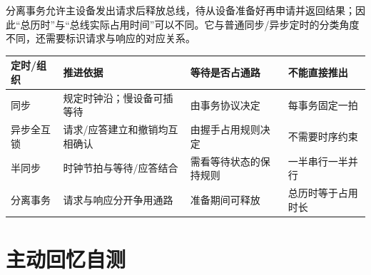 分离事务允许主设备发出请求后释放总线，待从设备准备好再申请并返回结果；因此``总历时''与``总线实际占用时间''可以不同。它与普通同步/异步定时的分类角度不同，还需要标识请求与响应的对应关系。

\begin{wideblock}

\par\medskip\noindent\begin{minipage}{\linewidth}\fontsize{9.3}{12}\selectfont\begin{tabularx}{\linewidth}{@{}YYYY@{}}
\toprule\noalign{}
\begin{minipage}[b]{\linewidth}\raggedright
定时/组织
\end{minipage} & \begin{minipage}[b]{\linewidth}\raggedright
推进依据
\end{minipage} & \begin{minipage}[b]{\linewidth}\raggedright
等待是否占通路
\end{minipage} & \begin{minipage}[b]{\linewidth}\raggedright
不能直接推出
\end{minipage} \\
\midrule\noalign{}


同步 & 规定时钟沿；慢设备可插等待 & 由事务协议决定 & 每事务固定一拍 \\
异步全互锁 & 请求/应答建立和撤销均互相确认 & 由握手占用规则决定 & 不需要时序约束 \\
半同步 & 时钟节拍与等待/应答结合 & 需看等待状态的保持规则 & 一半串行一半并行 \\
分离事务 & 请求与响应分开争用通路 & 准备期间可释放 & 总历时等于占用时长 \\
\bottomrule\end{tabularx}
\end{minipage}\par\medskip

\end{wideblock}

\section{主动回忆自测}\label{CO06-recall}

